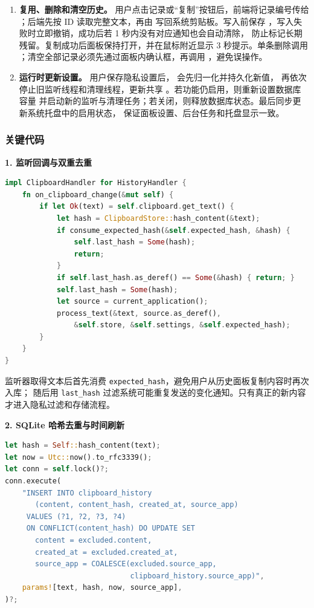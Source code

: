 \documentclass[12pt,a4paper]{ctexart}
\begin{document}
\begin{sloppypar}
\begin{enumerate}[label=(\arabic*)]
  \item \textbf{复用、删除和清空历史。}
    用户点击记录或“复制”按钮后，前端将记录编号传给 ；后端先按
    ID 读取完整文本，再由  写回系统剪贴板。写入前保存
    ，写入失败时立即撤销，成功后若 1 秒内没有对应通知也会自动清除，
    防止标记长期残留。复制成功后面板保持打开，并在鼠标附近显示 3 秒提示。单条删除调用
    ；清空全部记录必须先通过面板内确认框，再调用
    ，避免误操作。

  \item \textbf{运行时更新设置。}
    用户保存隐私设置后， 会先归一化并持久化新值，
    再依次停止旧监听线程和清理线程，更新共享 。若功能仍启用，则重新设置数据库容量
    并启动新的监听与清理任务；若关闭，则释放数据库状态。最后同步更新系统托盘中的启用状态，
    保证面板设置、后台任务和托盘显示一致。
\end{enumerate}
\end{sloppypar}

\subsubsection{关键代码}

\textbf{1. 监听回调与双重去重}

\begin{lstlisting}[language=Rust, caption=剪贴板变化监听]
impl ClipboardHandler for HistoryHandler {
    fn on_clipboard_change(&mut self) {
        if let Ok(text) = self.clipboard.get_text() {
            let hash = ClipboardStore::hash_content(&text);
            if consume_expected_hash(&self.expected_hash, &hash) {
                self.last_hash = Some(hash);
                return;
            }
            if self.last_hash.as_deref() == Some(&hash) { return; }
            self.last_hash = Some(hash);
            let source = current_application();
            process_text(&text, source.as_deref(),
                &self.store, &self.settings, &self.expected_hash);
        }
    }
}
\end{lstlisting}

监听器取得文本后首先消费 \texttt{expected\_hash}，避免用户从历史面板复制内容时再次入库；
随后用 \texttt{last\_hash} 过滤系统可能重复发送的变化通知。只有真正的新内容才进入隐私过滤和存储流程。

\textbf{2. SQLite 哈希去重与时间刷新}

\begin{lstlisting}[language=Rust, caption=剪贴板历史持久化]
let hash = Self::hash_content(text);
let now = Utc::now().to_rfc3339();
let conn = self.lock()?;
conn.execute(
    "INSERT INTO clipboard_history
       (content, content_hash, created_at, source_app)
     VALUES (?1, ?2, ?3, ?4)
     ON CONFLICT(content_hash) DO UPDATE SET
       content = excluded.content,
       created_at = excluded.created_at,
       source_app = COALESCE(excluded.source_app,
                             clipboard_history.source_app)",
    params![text, hash, now, source_app],
)?;
\end{lstlisting}
\end{document}
